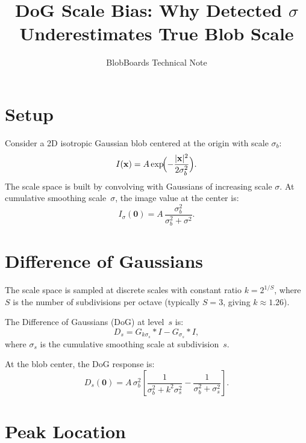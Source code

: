 \documentclass[11pt]{article}
\title{DoG Scale Bias: Why Detected $\sigma$ Underestimates True Blob Scale}
\author{BlobBoards Technical Note}
\date{}
\begin{document}
\maketitle

\section{Setup}

Consider a 2D isotropic Gaussian blob centered at the origin with scale
$\sigma_b$:
\begin{equation}
  I(\mathbf{x}) = A \exp\!\Bigl(-\frac{|\mathbf{x}|^2}{2\sigma_b^2}\Bigr).
\end{equation}
The scale space is built by convolving with Gaussians of increasing scale
$\sigma$. At cumulative smoothing scale~$\sigma$, the image value at the
center is:
\begin{equation}
  I_\sigma(\mathbf{0})
    = A \,\frac{\sigma_b^2}{\sigma_b^2 + \sigma^2}.
  \label{eq:smoothed-center}
\end{equation}

\section{Difference of Gaussians}

The scale space is sampled at discrete scales with constant ratio
$k = 2^{1/S}$, where $S$ is the number of subdivisions per octave
(typically $S=3$, giving $k \approx 1.26$).

The Difference of Gaussians (DoG) at level~$s$ is:
\begin{equation}
  D_s = G_{k\sigma_s} * I - G_{\sigma_s} * I,
\end{equation}
where $\sigma_s$ is the cumulative smoothing scale at subdivision~$s$.

At the blob center, the DoG response is:
\begin{equation}
  D_s(\mathbf{0})
    = A\,\sigma_b^2
      \left[
        \frac{1}{\sigma_b^2 + k^2\sigma_s^2}
        - \frac{1}{\sigma_b^2 + \sigma_s^2}
      \right].
  \label{eq:dog-center}
\end{equation}

\section{Peak Location}
\end{document}
